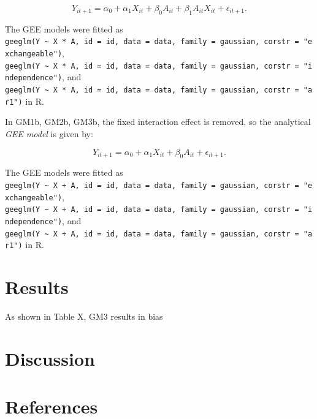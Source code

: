 \documentclass[
  12pt,
  a4paper,
]{article}
\begin{document}
\[
Y_{it+1} = \alpha_0 + \alpha_1 X_{it} + \beta_0 A_{it} + \beta_1 A_{it} X_{it} + \epsilon_{it+1}.
\]

The GEE models were fitted as
\texttt{geeglm(Y\ \textasciitilde{}\ X\ *\ A,\ id\ =\ id,\ data\ =\ data,\ family\ =\ gaussian,\ corstr\ =\ "exchangeable")},
\texttt{geeglm(Y\ \textasciitilde{}\ X\ *\ A,\ id\ =\ id,\ data\ =\ data,\ family\ =\ gaussian,\ corstr\ =\ "independence")},
and
\texttt{geeglm(Y\ \textasciitilde{}\ X\ *\ A,\ id\ =\ id,\ data\ =\ data,\ family\ =\ gaussian,\ corstr\ =\ "ar1")}
in R.

In GM1b, GM2b, GM3b, the fixed interaction effect is removed, so the
analytical \emph{GEE model} is given by:

\[
Y_{it+1} = \alpha_0 + \alpha_1 X_{it} + \beta_0 A_{it} + \epsilon_{it+1}.
\]

The GEE models were fitted as
\texttt{geeglm(Y\ \textasciitilde{}\ X\ +\ A,\ id\ =\ id,\ data\ =\ data,\ family\ =\ gaussian,\ corstr\ =\ "exchangeable")},
\texttt{geeglm(Y\ \textasciitilde{}\ X\ +\ A,\ id\ =\ id,\ data\ =\ data,\ family\ =\ gaussian,\ corstr\ =\ "independence")},
and
\texttt{geeglm(Y\ \textasciitilde{}\ X\ +\ A,\ id\ =\ id,\ data\ =\ data,\ family\ =\ gaussian,\ corstr\ =\ "ar1")}
in R.

\section{Results}\label{results}

As shown in Table X, GM3 results in bias

\section{Discussion}\label{discussion}

\newpage

\section{References}\label{references}
\end{document}
